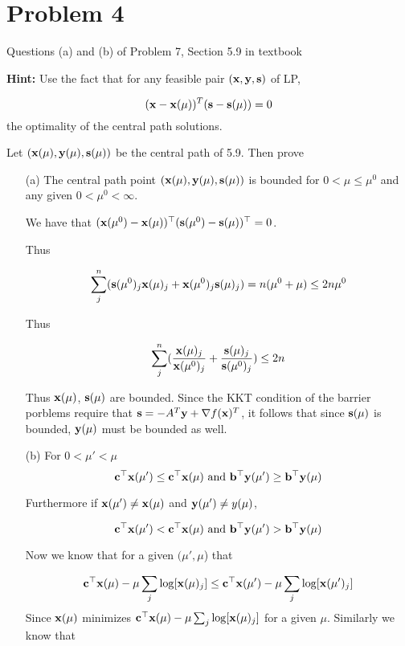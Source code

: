 \documentclass[answers]{exam} %
\renewcommand\b{{\bf b}}
\newcommand\x{{\bf x}}
\newcommand\cc{{\bf c}}
\renewcommand\b{{\bf b}}
\newcommand\y{{\bf y}}
\newcommand\s{{\bf s}}
\begin{document}
\section*{ Problem 4}
Questions (a) and (b) of Problem 7, Section 5.9 in textbook 

\textbf{Hint:} Use the fact that for any feasible pair $(\x,\y,\s)
$ of LP, 

\[
(\x - \x(\mu))^{T}(\s - \s(\mu)) = 0
\]
the optimality of the central path solutions. 


Let $(\x(\mu), \y( \mu), \s(\mu))$ be the central path of 5.9. Then prove 

\begin{itemize}
\item[(a)] The central path point $(\x(\mu), \y(\mu), \s(\mu))$ is bounded for $0 < \mu \leq \mu^{0}$ and any given $0 < \mu^{0} < \infty$. 

\begin{framed}
We have that $(\x(\mu^{0}) - \x(\mu))^{\top} ( \s(\mu^{0})  - \s(\mu))^{\top} = 0$.
 
Thus

\[
\sum_{j}^{n} (\s(\mu^{0})_j \x(\mu)_j  + \x(\mu^{0})_j \s(\mu)_j ) = n(\mu^0 + \mu) \leq 2 n \mu^{0}
\]

Thus 

\[
\sum_{j}^{n} ( \frac{ \x(\mu)_j}{\x(\mu^{0})_j} + \frac{\s(\mu)_j}{\s(\mu^0)_j}) \leq 2n
\]

Thus $\x(\mu)$, $\s(\mu)$ are bounded. Since the KKT condition of the barrier porblems require that $\s = -A^{T}\y + \nabla f(\x)^{T}$, it follows that since $\s(\mu)$ is bounded, $\y(\mu)$ must be bounded as well.

\end{framed}
\item[(b)] For $ 0 < \mu' < \mu$ 
\[
\cc^{\top} \x(\mu') \leq \cc^{\top} \x(\mu) \mbox{  and } \b^{\top} \y(\mu') \geq \b^{\top} \y(\mu)
\]

Furthermore if $\x(\mu') \neq  \x(\mu)$ and $\y(\mu') \neq y(\mu)$,

\[
\cc^{\top} \x(\mu') < \cc^{\top} \x(\mu) \mbox{  and } \b^{\top} \y(\mu') > \b^{\top} \y(\mu)
\]

\begin{framed}
Now we know that for a given $(\mu', \mu$) that 


\[
\cc^{\top} \x(\mu) - \mu \sum_{j} \log[\x(\mu)_j] \leq \cc^{\top} \x(\mu') - \mu \sum_{j} \log[\x(\mu')_j] 
\]
Since $\x(\mu)$ minimizes $\cc^{\top} \x(\mu) - \mu \sum_{j} \log[\x(\mu)_j]$ for a given $\mu$. Similarly we know that



\end{framed}
\end{itemize}
\end{document}
